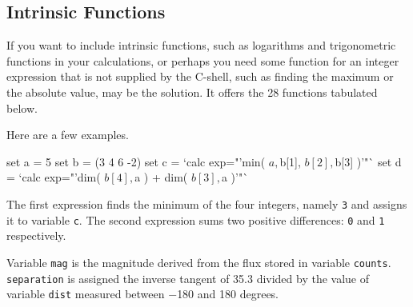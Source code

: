 \documentclass[twoside,11pt,nolof]{starlink}
\begin{document}
\subsection{Intrinsic Functions
\label{sc4_se_intrinsic}}

If you want to include intrinsic functions, such as logarithms and
trigonometric functions in your calculations, or perhaps you need some
function for an integer expression that is not supplied by the
C-shell, such as finding the maximum or the absolute value,
 may be the solution.  It offers the
28 functions tabulated below.

Here are a few examples.

\begin{small}
\begin{terminalv}
     set a = 5
     set b = (3 4 6 -2)
     set c = `calc exp="'min( $a, $b[1], $b[2], $b[3] )'"`
     set d = `calc exp="'dim( $b[4], $a ) + dim( $b[3], $a )'"`
\end{terminalv}
\end{small}
The first expression finds the minimum of the four integers, namely
\texttt{3} and assigns it to variable \texttt{c}.  The second expression
sums two positive differences: \texttt{0} and \texttt{1} respectively.

\begin{small}
\end{small}
Variable \texttt{mag} is the magnitude derived from the flux
stored in variable \texttt{counts}.  \texttt{separation} is assigned
the inverse tangent of 35.3 divided by the value of variable
\texttt{dist} measured between $-$180 and 180 degrees.

\bigskip
\end{document}
